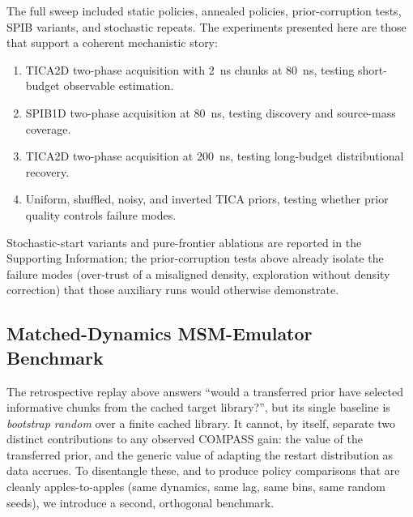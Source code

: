 \documentclass[journal=jctcce,manuscript=article,layout=twocolumn]{achemso}
\begin{document}
The full sweep included static policies, annealed policies, prior-corruption tests, SPIB variants, and stochastic repeats. The experiments presented here are those that support a coherent mechanistic story:
\begin{enumerate}
    \item TICA2D two-phase acquisition with \SI{2}{ns} chunks at \SI{80}{ns}, testing short-budget observable estimation.
    \item SPIB1D two-phase acquisition at \SI{80}{ns}, testing discovery and source-mass coverage.
    \item TICA2D two-phase acquisition at \SI{200}{ns}, testing long-budget distributional recovery.
    \item Uniform, shuffled, noisy, and inverted TICA priors, testing whether prior quality controls failure modes.
\end{enumerate}
Stochastic-start variants and pure-frontier ablations are reported in the Supporting Information; the prior-corruption tests above already isolate the failure modes (over-trust of a misaligned density, exploration without density correction) that those auxiliary runs would otherwise demonstrate.

\subsection{Matched-Dynamics MSM-Emulator Benchmark}
\label{sec:methods_msm}

The retrospective replay above answers ``would a transferred prior have selected informative chunks from the cached target library?'', but its single baseline is \emph{bootstrap random} over a finite cached library. It cannot, by itself, separate two distinct contributions to any observed COMPASS gain: the value of the transferred prior, and the generic value of adapting the restart distribution as data accrues. To disentangle these, and to produce policy comparisons that are cleanly apples-to-apples (same dynamics, same lag, same bins, same random seeds), we introduce a second, orthogonal benchmark.
\end{document}

